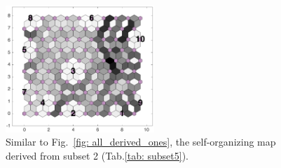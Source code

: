 \begin{figure}
        \centering
        \includegraphics[width=0.5\textwidth]{../../images0.01/M31/2D/image_subsets/subset5_dist_with_hits_t.png}
    \caption{Similar to Fig.~\ref{fig: all_derived_ones}, the self-organizing map derived  from subset 2 (Tab.\ref{tab: subset5}).}
    \label{fig: subset5}
\end{figure}
